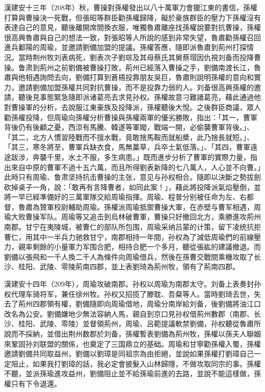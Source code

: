 漢建安十三年（208年）秋，曹操對孫權發出以八十萬軍力會獵江東的書信，孫權打算與曹操決一死戰，但張昭等群臣勸孫權歸降，礙於豪族群臣的壓力下孫權沒有表達自己的意見，聽後離開席間換衣服，唯獨魯肅離座找孫權說要對抗曹操，孫權很高興魯肅與自己的想法一致，對張昭等人所說的感到非常失望，魯肅勸孫權召回進兵鄱陽的周瑜，並邀請劉備加盟的提議。孫權答應，隨即派魯肅到荊州打探情況。當時荆州牧刘表病死，劉表次子劉琮及其母蔡氏其舅蔡瑁因仇視刘备而投降曹操。鲁肃到荊州之前劉備被曹操打敗，荊州已經落入曹操之手，劉備南渡长江，魯肅與他相遇詢問去向，劉備打算到蒼梧投靠朋友吳巨，魯肅則說明孫權的意向和實力，邀請劉備加盟孫權共同對抗曹操，而不是投靠力弱的人。刘备很高興孫權的邀請，聽後見事態緊急隨即派诸葛亮去求見孙权。孫權故意刁難諸葛亮，藉此通過他對曹操軍的分析，去說服江東豪族及投降派，孫權聽後大悅。之後群臣商議，眾人勸孫權投降，但周瑜向孫權分析曹操與孫權兩軍的優劣勝敗，指出：「其一，曹軍背後仍有後顧之憂，西涼有馬騰、韓遂等軍閥，戰端一開，必偷襲曹軍背後。」、「其二，北方人慣習陸戰而不擅水戰，竟敢捨馬鞍而就船槳，此乃捨長就短。」、「其三，寒冬將至，曹軍兵缺衣食，馬無藁草，兵卒士氣低落。」、「其四，曹軍遠途跋涉，奔襲千里，水土不服，多生病患。」既而進步分析了曹軍的實際力量，指出來自中原的曹軍不過十五六萬，而且所得劉表新降的七八萬人，人心並不向曹。」此時只有周瑜、鲁肃坚持抗击曹操的主张，意见与孙权相合。隨即以決斷之勢拔劍砍掉桌子一角，說：「敢再有言降曹者，如同此案！」，藉此將投降派氣焰壓倒，並將一早已經準備好的三萬軍隊交給周瑜指揮。周瑜、程普分别被任命为左、右都督，魯肅為贊軍校尉輔助周瑜。孫權派周瑜抵禦曹操大軍，在赤壁与曹军相遇，周瑜大败曹操军队。周瑜等又追击到烏林破曹軍，曹操只好撤回北方，乘勝進攻荊州南郡。甘宁在夷陵城，被曹仁的部队所包围，周瑜采纳吕蒙的计策，留下凌统抗拒曹仁，用其中一半兵力驰救甘宁，南郡相持一年間，孙权為了減低周瑜們的前線壓力，親率剩餘的小量軍力军围合肥，相持合肥一个多月，聽從張紘的建議撤退。而劉備以張飛和一千人換二千人為條件向周瑜借兵，然後在孫曹交戰間乘機攻取了长沙、桂阳、武陵、零陵荊南四郡，並上表劉琦為荊州牧，領有了荊南四郡。

漢建安十四年（209年），周瑜攻破南郡。孙权以周瑜为南郡太守。刘备上表奏封孙权代理车骑将军，兼任徐州牧。孙权又招揽了滕耽、吾粲等人。當時劉琦去世，失去了荊州四郡領有權，劉備隨即向周瑜借地，周瑜分南岸給刘备，後劉備將油江口改名為公安。劉備嫌地少無法容納人馬，親自到京口見孙权借荊州數郡（南郡、长沙、桂阳、武陵、零陵）並督領荊州，周瑜、呂範提議軟禁劉備，孙权聽從魯肅所說而不採納，並借出荆州数郡於刘备，孫權暫表劉備為荊州牧，孫權以孫夫人聯姻來鞏固孙刘联盟的關係，也奠定了三国鼎立的基础。周瑜和甘寧勸孫權入蜀，孫權邀請劉備共同取益州，劉備以劉璋是同祖宗為由拒絕，並說如果孫權打劉璋自己一定阻止，如果我打劉璋的話，我必定會披髮入山林歸隱，不做攻取同宗的事。孫權不聽，並派孫瑜進攻益州，劉備阻止並不給孫瑜前進的去路，並說不能這樣做，孫權只有下令退還。

